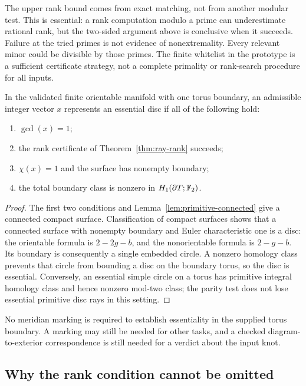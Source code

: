 The upper rank bound comes from exact matching, not from another modular test. This is essential: a rank computation modulo a prime can underestimate rational rank, but the two-sided argument above is conclusive when it succeeds. Failure at the tried primes is not evidence of nonextremality. Every relevant minor could be divisible by those primes. The finite whitelist in the prototype is a sufficient certificate strategy, not a complete primality or rank-search procedure for all inputs.

\begin{theorem}\label{thm:ray-disc}
In the validated finite orientable manifold with one torus boundary, an admissible integer vector $x$ represents an essential disc if all of the following hold:
\begin{enumerate}
\item $\gcd(x)=1$;
\item the rank certificate of Theorem~\ref{thm:ray-rank} succeeds;
\item $\chi(x)=1$ and the surface has nonempty boundary;
\item the total boundary class is nonzero in $H_1(\partial T;\mathbb F_2)$.
\end{enumerate}
\end{theorem}
\begin{proof}
The first two conditions and Lemma~\ref{lem:primitive-connected} give a connected compact surface. Classification of compact surfaces shows that a connected surface with nonempty boundary and Euler characteristic one is a disc: the orientable formula is $2-2g-b$, and the nonorientable formula is $2-g-b$. Its boundary is consequently a single embedded circle. A nonzero homology class prevents that circle from bounding a disc on the boundary torus, so the disc is essential. Conversely, an essential simple circle on a torus has primitive integral homology class and hence nonzero mod-two class; the parity test does not lose essential primitive disc rays in this setting.
\end{proof}

No meridian marking is required to establish essentiality in the supplied torus boundary. A marking may still be needed for other tasks, and a checked diagram-to-exterior correspondence is still needed for a verdict about the input knot.

\subsection{Why the rank condition cannot be omitted}

